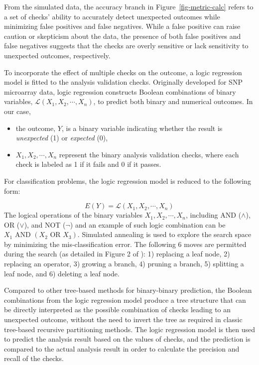 \documentclass[
  12pt,
]{interact}
\providecommand{\tightlist}{%
  \setlength{\itemsep}{0pt}\setlength{\parskip}{0pt}}\usepackage{longtable,booktabs,array}
\begin{document}
From the simulated data, the accuracy branch in
Figure~\ref{fig-metric-calc} refers to a set of checks' ability to
accurately detect unexpected outcomes while minimizing false positives
and false negatives. While a false positive can raise caution or
skepticism about the data, the presence of both false positives and
false negatives suggests that the checks are overly sensitive or lack
sensitivity to unexpected outcomes, respectively.

To incorporate the effect of multiple checks on the outcome, a logic
regression model \citep{ruczinski_logic_2003} is fitted to the analysis
validation checks. Originally developed for SNP microarray data, logic
regression constructs Boolean combinations of binary variables,
\(\mathcal{L}(X_1, X_2, \cdots, X_n)\), to predict both binary and
numerical outcomes. In our case,

\begin{itemize}
\tightlist
\item
  the outcome, \(Y\), is a binary variable indicating whether the result
  is \emph{unexpected} (1) or \emph{expected} (0),
\item
  \(X_1, X_2, \cdots, X_n\) represent the binary analysis validation
  checks, where each check is labeled as 1 if it fails and 0 if it
  passes.
\end{itemize}

For classification problems, the logic regression model is reduced to
the following form:

\[E(Y) = \mathcal{L}(X_1, X_2, \cdots, X_n)\] The logical operations of
the binary variables \(X_1, X_2, \cdots, X_n\), including AND
(\(\land\)), OR (\(\lor\)), and NOT (\(\neg\)) and an example of such
logic combination can be \(X_1 \text{ AND } (X_2 \text{ OR } X_3)\).
Simulated annealing is used to explore the search space by minimizing
the mis-classification error. The following 6 moves are permitted during
the search (as detailed in Figure 2 of \citet{ruczinski_logic_2003}): 1)
replacing a leaf node, 2) replacing an operator, 3) growing a branch, 4)
pruning a branch, 5) splitting a leaf node, and 6) deleting a leaf node.

Compared to other tree-based methods for binary-binary prediction, the
Boolean combinations from the logic regression model produce a tree
structure that can be directly interpreted as the possible combination
of checks leading to an unexpected outcome, without the need to invert
the tree as required in classic tree-based recursive partitioning
methods. The logic regression model is then used to predict the analysis
result based on the values of checks, and the prediction is compared to
the actual analysis result in order to calculate the precision and
recall of the checks.
\end{document}
